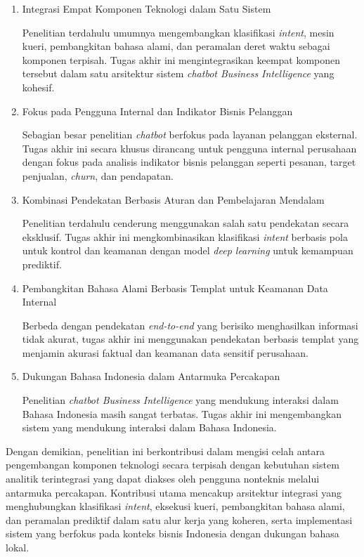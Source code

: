 \begin{enumerate}
    \item Integrasi Empat Komponen Teknologi dalam Satu Sistem 
    
    Penelitian terdahulu umumnya mengembangkan klasifikasi \textit{intent}, mesin kueri, pembangkitan bahasa alami, dan peramalan deret waktu sebagai komponen terpisah. Tugas akhir ini mengintegrasikan keempat komponen tersebut dalam satu arsitektur sistem \textit{chatbot Business Intelligence} yang kohesif.
    
    \item Fokus pada Pengguna Internal dan Indikator Bisnis Pelanggan 
    
    Sebagian besar penelitian \textit{chatbot} berfokus pada layanan pelanggan eksternal. Tugas akhir ini secara khusus dirancang untuk pengguna internal perusahaan dengan fokus pada analisis indikator bisnis pelanggan seperti pesanan, target penjualan, \textit{churn}, dan pendapatan.
    
    \item Kombinasi Pendekatan Berbasis Aturan dan Pembelajaran Mendalam 
    
    Penelitian terdahulu cenderung menggunakan salah satu pendekatan secara eksklusif. Tugas akhir ini mengkombinasikan klasifikasi \textit{intent} berbasis pola untuk kontrol dan keamanan dengan model \textit{deep learning} untuk kemampuan prediktif.
    
    \item Pembangkitan Bahasa Alami Berbasis Templat untuk Keamanan Data Internal 
    
    Berbeda dengan pendekatan \textit{end-to-end} yang berisiko menghasilkan informasi tidak akurat, tugas akhir ini menggunakan pendekatan berbasis templat yang menjamin akurasi faktual dan keamanan data sensitif perusahaan.
    
    \item Dukungan Bahasa Indonesia dalam Antarmuka Percakapan 
    
    Penelitian \textit{chatbot Business Intelligence} yang mendukung interaksi dalam Bahasa Indonesia masih sangat terbatas. Tugas akhir ini mengembangkan sistem yang mendukung interaksi dalam Bahasa Indonesia.
\end{enumerate}

Dengan demikian, penelitian ini berkontribusi dalam mengisi celah antara pengembangan komponen teknologi secara terpisah dengan kebutuhan sistem analitik terintegrasi yang dapat diakses oleh pengguna nonteknis melalui antarmuka percakapan. Kontribusi utama mencakup arsitektur integrasi yang menghubungkan klasifikasi \textit{intent}, eksekusi kueri, pembangkitan bahasa alami, dan peramalan prediktif dalam satu alur kerja yang koheren, serta implementasi sistem yang berfokus pada konteks bisnis Indonesia dengan dukungan bahasa lokal.







